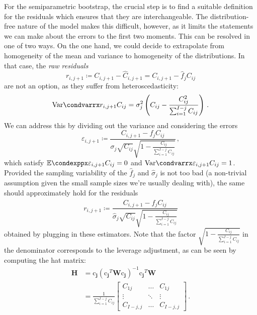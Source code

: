 \documentclass[a4paper]{book}
\begin{document}
For the semiparametric bootstrap, the crucial step is to find a suitable definition for the residuals which ensures that they are interchangeable. The distribution-free nature of the model makes this difficult, however, as it limits the statements we can make about the errors to the first two moments. This can be resolved in one of two ways. On the one hand, we could decide to extrapolate from homogeneity of the mean and variance to homogeneity of the distributions. In that case, the \emph{raw residuals}
\begin{equation}
  r_{i, j + 1} \coloneqq C_{i, j + 1} - \widehat{C}_{i, j + 1} = C_{i, j + 1} - \widehat{f}_j C_{ij}
\end{equation}
are not an option, as they suffer from heteroscedasticity:
\begin{equation}
  \condvarr{r_{i, j + 1}}{C_{ij}} = \sigma^2_j \left( C_{ij} - \frac{C^2_{ij}}{\sum_{i = 1}^{I - j} C_{ij}} \right) \,.
\end{equation}
We can address this by dividing out the variance and considering the errors
\begin{equation}
  \varepsilon_{i, j + 1} \coloneqq \frac{C_{i, j + 1} - f_j C_{ij}}{\sigma_j \sqrt{C_{ij}} \sqrt{1 - \frac{C_{ij}}{\sum_{i = 1}^{I - j} C_{ij}}}} \,,
\end{equation}
which satisfy $\condexpp{\varepsilon_{i, j + 1}}{C_{ij}} = 0$ and $\condvarr{\varepsilon_{i, j + 1}}{C_{ij}} = 1$. Provided the sampling variability of the $\widehat{f}_j$ and $\widehat{\sigma}_j$ is not too bad (a non-trivial assumption given the small sample sizes we're usually dealing with), the same should approximately hold for the residuals
\begin{equation}
  r_{i, j + 1} \coloneqq \frac{C_{i, j + 1} - \widehat{f}_j C_{ij}}{\widehat{\sigma}_j \sqrt{C_{ij}} \sqrt{1 - \frac{C_{ij}}{\sum_{i = 1}^{I - j} C_{ij}}}}
\end{equation}
obtained by plugging in these estimators. Note that the factor $\sqrt{1 - \frac{C_{ij}}{\sum_{i = 1}^{I - j} C_{ij}}}$ in the denominator corresponds to the leverage adjustment, as can be seen by computing the hat matrix:
\begin{align}
  \mathbf{H} & = \bm{\mathrm{c}_j} (\bm{\mathrm{c}_j}^T \mathbf{W} \bm{\mathrm{c}_j})^{-1} \bm{\mathrm{c}_j}^T \mathbf{W} \\[4pt]
             & = \frac{1}{\sum_{i = 1}^{I - j} C_{ij}}
  \begin{bmatrix}
    C_{1j}       & \dots  & C_{1j}       \\
    \vdots       & \ddots & \vdots       \\
    C_{I - j, j} & \dots  & C_{I - j, j}
  \end{bmatrix} \,.
\end{align}
\end{document}
